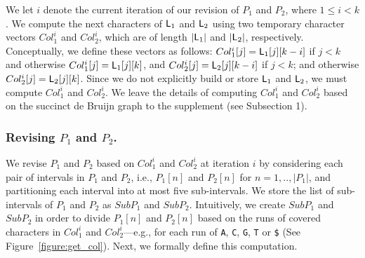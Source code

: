 We let $i$ denote the current iteration of our revision of $P_1$ and $P_2$, where $1 \leq i < k$. We compute the next characters of $\mbox{\rm {\sf L}}_1$ and $\mbox{\rm {\sf L}}_2$ using two temporary character vectors $Col_1^i$ and $Col_2^i$, which are of length $|\mbox{\rm {\sf L}}_1|$ and $|\mbox{\rm {\sf L}}_2|$, respectively.    Conceptually, we define these vectors as follows: $Col_1^i[j] = \mbox{\rm {\sf L}}_1[j][k-i]$ if $j < k$ and otherwise $Col_1^i[j] = \mbox{\rm {\sf L}}_1[j][k]$, and $Col_2^i[j] = \mbox{\rm {\sf L}}_2[j][k-i]$ if $j < k$; and otherwise $Col_2^i[j] =  \mbox{\rm {\sf L}}_2[j][k]$. Since we do not explicitly build or store $\mbox{\rm {\sf L}}_1$ and $\mbox{\rm {\sf L}}_2$, we must compute $Col_1^i$ and $Col_2^i$.  We leave the details of computing $Col_1^i$ and $Col_2^i$ based on the succinct de Bruijn graph to the supplement (see Subsection 1).




\subsubsection{Revising $P_1$ and $P_2$.}
We revise $P_1$ and $P_2$ based on $Col_1^i$ and $Col_2^i$ at iteration $i$ by considering each pair of intervals in $P_1$ and $P_2$, i.e., $P_1[n]$ and $P_2[n]$ for $n = 1,.., |P_1|$, and partitioning each interval into at most five sub-intervals.  We store the list of sub-intervals of $P_1$ and $P_2$ as $SubP_1$ and $SubP_2$. Intuitively, we create $SubP_1$ and $SubP_2$ in order to divide $P_1[n]$ and $P_2[n]$ based on the runs of covered characters in  $Col_1^i$ and  $Col_2^i$---e.g., for each run of {\tt A}, {\tt C}, {\tt G}, {\tt T} or {\tt \$} (See Figure~\ref{figure:get_col}). Next, we formally define this computation.

